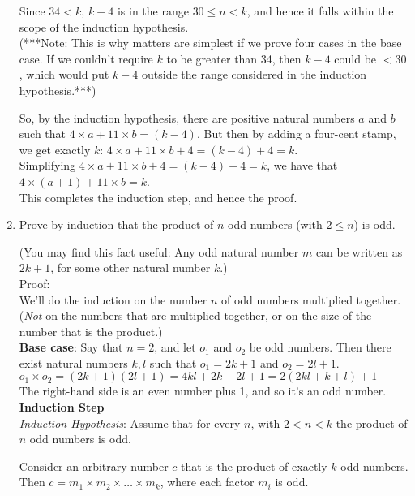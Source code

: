 \documentclass[12pt]{article}
\begin{document}
\begin{enumerate}
Since $34<k$, $k - 4$ is in the range $30 \leq n < k$, and hence it falls within the scope of the induction hypothesis.\\

(***Note: This is why matters are simplest if we prove four cases in the base case. If we couldn't require $k$ to be greater than 34, then $k-4$ could be $<30$, which would put $k-4$ outside the range considered in the induction hypothesis.***)

So, by the induction hypothesis, there are positive natural numbers $a$ and $b$ such that $4\times a + 11 \times b = (k-4)$.
But then by adding a four-cent stamp, we get exactly $k$: $4\times a + 11 \times b + 4 = (k-4) +4 = k$.\\

Simplifying $4\times a + 11 \times b + 4 = (k-4) +4 = k$, we have that $4\times (a+1) + 11 \times b = k$. \\
This completes the induction step, and hence the proof.\\

\newpage

\item Prove by induction that the product of $n$ odd numbers (with $2 \leq n$) is odd.

(You may find this fact useful: Any odd natural number $m$ can be written as $2k+1$, for some other natural number $k$.)\\

Proof:\\
We'll do the induction on the number $n$ of odd numbers multiplied together. ({\it{Not}} on the numbers that are multiplied together, or on the size of the number that is the product.)\\

{\bf{Base case}}: Say that $n = 2$, and let $o_1$ and $o_2$ be odd numbers. Then there exist natural numbers $k, l$ such that $o_1 = 2k+1$ and $o_2 = 2l+1$.\\

$o_1 \times o_2 = (2k + 1)(2l + 1) = 4kl + 2k + 2l +1 = 2(2kl + k + l) +1$\\

The right-hand side is an even number plus 1, and so it's an odd number.\\

{\bf{Induction Step}}\\
{\it{Induction Hypothesis}}: Assume that for every $n$, with $2 < n < k$ the product of $n$ odd numbers is odd.

Consider an arbitrary number $c$ that is the product of  exactly $k$ odd numbers. Then $c = m_1 \times m_2 \times \ldots \times m_k$, where each factor $m_i$ is odd. 


\end{enumerate}
\end{document}
